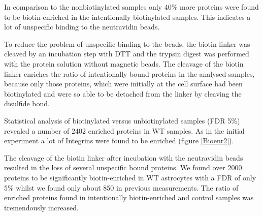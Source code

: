 \documentclass[a4paper,11pt,bibtotocnumbered]{article}
\begin{document}
In comparison to the nonbiotinylated samples only 40\% more proteins were found to be biotin-enriched in the intentionally biotinylated samples. This indicates a lot of unspecific binding to the neutravidin beads.

To reduce the problem of unspecific binding to the beads, the biotin linker was cleaved by an incubation step with DTT and the trypsin digest was performed with the protein solution without magnetic beads. The cleavage of the biotin linker enriches the ratio of intentionally bound proteins in the analysed samples, because only those proteins, which were initially at the cell surface had been biotinylated and were so able to be detached from the linker by cleaving the disulfide bond.


Statistical analysis of biotinylated versus unbiotinylated samples (FDR 5\%) revealed a number of 2402 enriched proteins in WT samples. As in the initial experiment a lot of Integrins were found to be enriched (figure \ref{Bioenr2}).




The cleavage of the biotin linker after incubation with the neutravidin beads resulted in the loss of several unspecific bound proteins. We found over 2000 proteins to be significantly biotin-enriched in WT astrocytes with a FDR of only 5\% whilst we found only about 850 in previous measurements. The ratio of enriched proteins found in intentionally biotin-enriched and control samples was tremendously increased.  

\end{document}
